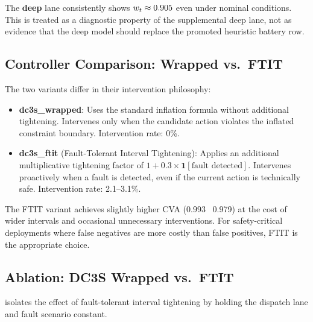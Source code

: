 The \textbf{deep} lane consistently shows $w_t \approx 0.905$ even under nominal
conditions.  This is treated as a diagnostic property of the supplemental deep
lane, not as evidence that the deep model should replace the promoted heuristic
battery row.

\subsection{Controller Comparison: Wrapped vs.\ FTIT}

The two \dcs{} variants differ in their intervention philosophy:

\begin{itemize}[nosep]
  \item \textbf{dc3s\_wrapped}: Uses the standard inflation formula without
        additional tightening.  Intervenes only when the candidate action
        violates the inflated constraint boundary.  Intervention rate: 0\%.
  \item \textbf{dc3s\_ftit} (Fault-Tolerant Interval Tightening): Applies an
        additional multiplicative tightening factor of $1 + 0.3 \times
        \mathbf{1}[\text{fault detected}]$.  Intervenes proactively when a fault
        is detected, even if the current action is technically safe.
        Intervention rate: 2.1--3.1\%.
\end{itemize}

The FTIT variant achieves slightly higher CVA (0.993 \vs\ 0.979) at the cost of
wider intervals and occasional unnecessary interventions.  For safety-critical
deployments where false negatives are more costly than false positives, FTIT is
the appropriate choice.

\subsection{Ablation: DC3S Wrapped vs.\ FTIT}

 isolates the effect of fault-tolerant interval
tightening by holding the dispatch lane and fault scenario constant.

\begin{table}[t]
\caption{Ablation: DC3S Wrapped vs.\ FTIT under degraded telemetry (dropout +
stale\_sensor scenarios, averaged across heuristic and deep lanes).}
\label{tab:battery_ablation}
\centering\small
{}
\end{table}

